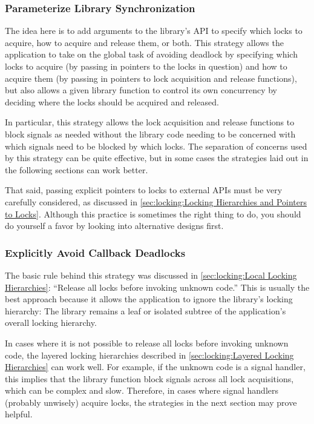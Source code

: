 \subsubsection{Parameterize Library Synchronization}
\label{sec:locking:Parameterize Library Synchronization}

The idea here is to add arguments to the library's API to specify
which locks to acquire, how to acquire and release them, or both.
This strategy allows the application to take on the global task of
avoiding deadlock by specifying which locks to acquire (by passing in
pointers to the locks in question) and how to
acquire them (by passing in pointers to lock acquisition and release
functions),
but also allows a given library function to control its own concurrency
by deciding where the locks should be acquired and released.

In particular, this strategy allows the lock acquisition and release
functions to block signals as needed without the library code needing to
be concerned with which signals need to be blocked by which locks.
The separation of concerns used by this strategy can be quite effective,
but in some cases the strategies laid out in the following sections
can work better.

That said, passing explicit pointers to locks to external APIs must
be very carefully considered, as discussed in
\cref{sec:locking:Locking Hierarchies and Pointers to Locks}.
Although this practice is sometimes the right thing to do, you should do
yourself a favor by looking into alternative designs first.

\subsubsection{Explicitly Avoid Callback Deadlocks}
\label{sec:locking:Explicitly Avoid Callback Deadlocks}

The basic rule behind this strategy was discussed in
\cref{sec:locking:Local Locking Hierarchies}:
``Release all locks before invoking unknown code.''
This is usually the best approach because it allows the application to
ignore the library's locking hierarchy:
The library remains a leaf or isolated subtree of the application's
overall locking hierarchy.

In cases where it is not possible to release all locks before invoking
unknown code, the layered locking hierarchies described in
\cref{sec:locking:Layered Locking Hierarchies} can work well.
For example, if the unknown code is a signal handler, this implies that
the library function block signals across all lock acquisitions, which
can be complex and slow.
Therefore, in cases where signal handlers (probably unwisely) acquire
locks, the strategies in the next section may prove helpful.

